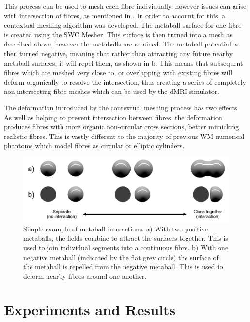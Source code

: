 This process can be used to mesh each fibre individually, however issues can arise with intersection of fibres, as mentioned in .
In order to account for this, a contextual meshing algorithm was developed.
The metaball surface for one fibre is created using the SWC Mesher.
This surface is then turned into a mesh as described above, however the metaballs are retained.
The metaball potential is then turned negative, meaning that rather than attracting any future nearby metaball surfaces, it will repel them, as shown in b.
This means that subsequent fibres which are meshed very close to, or overlapping with existing fibres will deform organically to resolve the intersection, thus creating a series of completely non-intersecting fibre meshes which can be used by the dMRI simulator.

The deformation introduced by the contextual meshing process has two effects.
As well as helping to prevent intersection between fibres, the deformation produces fibres with more organic non-circular cross sections, better mimicking realistic fibres.
This is vastly different to the majority of previous WM numerical phantoms which model fibres as circular or elliptic cylinders.


\begin{figure}
  \centering
  \includegraphics[width=\textwidth]{figures/config/metaballs.png}
  \caption[Simple example of metaball interactions.]{\small Simple example of metaball interactions. a) With two positive metaballs, the fields combine to attract the surfaces together. This is used to join individual segments into a continuous fibre. b) With one negative metaball (indicated by the flat grey circle) the surface of the metaball is repelled from the negative metaball. This is used to deform nearby fibres around one another.}
  \label{fig:metaballs}
\end{figure}



\section{Experiments and Results}
\label{sec:experiments_and_results}

